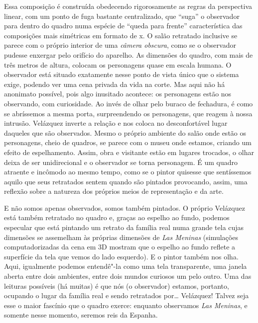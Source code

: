 Essa composição é construída obedecendo rigorosamente as regras da
perspectiva linear, com um ponto de fuga bastante centralizado, que
``suga'' o observador para dentro do quadro numa espécie de ``queda para
frente'' característica das composições mais simétricas em formato de x.
O salão retratado inclusive se parece com o próprio interior de uma
\emph{câmera obscura}, como se o observador pudesse enxergar pelo
orifício do aparelho. As dimensões do quadro, com mais de três metros de
altura, colocam os personagens quase em escala humana. O observador está
situado exatamente nesse ponto de vista único que o sistema exige,
podendo ver uma cena privada da vida na corte. Mas aqui não há anonimato
possível, pois algo inusitado acontece: os personagens estão nos
observando, com curiosidade. Ao invés de olhar pelo buraco de fechadura,
é como se abríssemos a mesma porta, surpreendendo os personagens, que
reagem à nossa intrusão. Velázquez inverte a relação e nos coloca no
desconfortável lugar daqueles que são observados. Mesmo o próprio
ambiente do salão onde estão os personagens, cheio de quadros, se parece
com o museu onde estamos, criando um efeito de espelhamento. Assim, obra
e visitante estão em lugares trocados, o olhar deixa de ser
unidirecional e o observador se torna personagem. É um quadro atraente e
incômodo ao mesmo tempo, como se o pintor quisesse que sentíssemos
aquilo que seus retratados sentem quando são pintados provocando, assim,
uma reflexão sobre a natureza dos próprios meios de representação e da
arte.

E não somos apenas observados, somos também pintados. O próprio
Velázquez está também retratado no quadro e, graças ao espelho ao fundo,
podemos especular que está pintando um retrato da família real numa
grande tela cujas dimensões se assemelham às próprias dimensões de
\emph{Las Meninas} (simulações computadorizadas da cena em 3D mostram
que o espelho ao fundo reflete a superfície da tela que vemos do lado
esquerdo). E o pintor também nos olha. Aqui, igualmente podemos entendê"-la
como uma tela transparente, uma janela aberta entre dois ambientes,
entre dois mundos curiosos um pelo outro. Uma das leituras possíveis (há
muitas) é que nós (o observador) estamos, portanto, ocupando o lugar da
família real e sendo retratados por\ldots{} Velázquez! Talvez seja esse o
maior fascínio que o quadro exerce: enquanto observamos \emph{Las
Meninas}, e somente nesse momento, seremos reis da Espanha.

